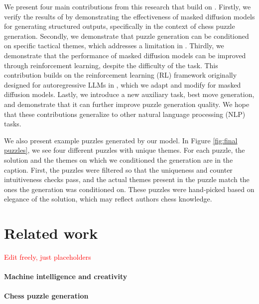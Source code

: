 \documentclass[letterpaper]{article} %
\begin{document}
We present four main contributions from this research that build on \cite{feng2025generatingcreativechesspuzzles}. Firstly, we verify the results of \cite{feng2025generatingcreativechesspuzzles} by demonstrating the effectiveness of masked diffusion models for generating structured outputs, specifically in the context of chess puzzle generation. Secondly, we demonstrate that puzzle generation can be conditioned on specific tactical themes, which addresses a limitation in \cite{feng2025generatingcreativechesspuzzles}. Thirdly, we demonstrate that the performance of masked diffusion models can be improved through reinforcement learning, despite the difficulty of the task. This contribution builds on the reinforcement learning (RL) framework  originally designed for autoregressive LLMs in \cite{feng2025generatingcreativechesspuzzles}, which we adapt and modify for masked diffusion models. Lastly, we introduce a new auxiliary task, best move generation, and demonstrate that it can further improve puzzle generation quality. We hope that these contributions generalize to other natural language processing (NLP) tasks.

We also present example puzzles generated by our model. In Figure \ref{fig:final puzzles}, we see four different puzzles with unique themes. For each puzzle, the solution and the themes on which we conditioned the generation are in the caption. First, the puzzles were filtered so that the uniqueness and counter intuitiveness checks pass, and the actual themes present in the puzzle match the ones the generation was conditioned on. These puzzles were hand-picked based on elegance of the solution, which may reflect authors chess knowledge.








\section{Related work}
\textcolor{red}{Edit freely, just placeholders}

\paragraph{Machine intelligence and creativity}


\paragraph{Chess puzzle generation}
\end{document}
